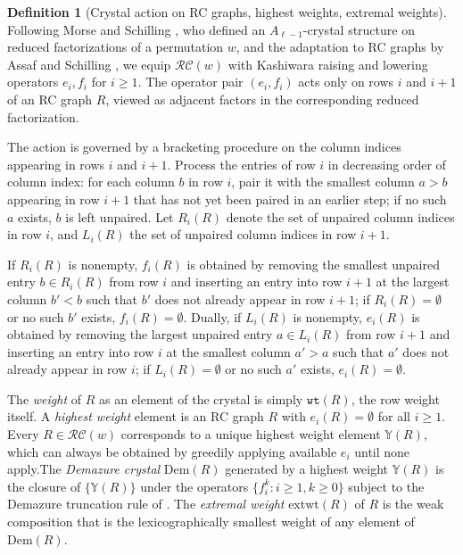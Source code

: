 \documentclass{amsart}
\theoremstyle{definition}
\newtheorem{definition}[lemma]{Definition}
\theoremstyle{remark}
\numberwithin{equation}{subsection}
\newcommand{\wtt}{\mathtt{wt}}
\newcommand{\RC}{\mathcal{RC}}
\begin{document}
\begin{definition}[Crystal action on RC graphs, highest weights, extremal weights] \label{definition:crystal}
Following Morse and Schilling \cite{morse2016crystal}, who defined an $A_{\ell-1}$-crystal structure on reduced factorizations of a permutation $w$, and the adaptation to RC graphs by Assaf and Schilling \cite{assaf2018demazure}, we equip $\RC(w)$ with Kashiwara raising and lowering operators $e_i, f_i$ for $i\geq 1$. The operator pair $(e_i, f_i)$ acts only on rows $i$ and $i+1$ of an RC graph $R$, viewed as adjacent factors in the corresponding reduced factorization.

The action is governed by a bracketing procedure on the column indices appearing in rows $i$ and $i+1$. Process the entries of row $i$ in decreasing order of column index: for each column $b$ in row $i$, pair it with the smallest column $a>b$ appearing in row $i+1$ that has not yet been paired in an earlier step; if no such $a$ exists, $b$ is left unpaired. Let $R_i(R)$ denote the set of unpaired column indices in row $i$, and $L_i(R)$ the set of unpaired column indices in row $i+1$.

If $R_i(R)$ is nonempty, $f_i(R)$ is obtained by removing the smallest unpaired entry $b\in R_i(R)$ from row $i$ and inserting an entry into row $i+1$ at the largest column $b' < b$ such that $b'$ does not already appear in row $i+1$; if $R_i(R) = \emptyset$ or no such $b'$ exists, $f_i(R) = \emptyset$. Dually, if $L_i(R)$ is nonempty, $e_i(R)$ is obtained by removing the largest unpaired entry $a\in L_i(R)$ from row $i+1$ and inserting an entry into row $i$ at the smallest column $a' > a$ such that $a'$ does not already appear in row $i$; if $L_i(R) = \emptyset$ or no such $a'$ exists, $e_i(R) = \emptyset$.

The \emph{weight} of $R$ as an element of the crystal is simply $\wtt(R)$, the row weight itself. A \emph{highest weight} element is an RC graph $R$ with $e_i(R) = \emptyset$ for all $i\geq 1$. Every $R\in \RC(w)$ corresponds to a unique highest weight element $\mathbb{Y}(R)$, which can always be obtained by greedily applying available $e_i$ until none apply.The \emph{Demazure crystal} $\mathrm{Dem}(R)$ generated by a highest weight $\mathbb{Y}(R)$ is the closure of $\{\mathbb{Y}(R)\}$ under the operators $\{f_i^k : i\geq 1, k\geq 0\}$ subject to the Demazure truncation rule of \cite{assaf2018demazure}. The \emph{extremal weight} $\mathrm{extwt}(R)$ of $R$ is the weak composition that is the lexicographically smallest weight of any element of $\mathrm{Dem}(R)$.
\end{definition}
\end{document}
